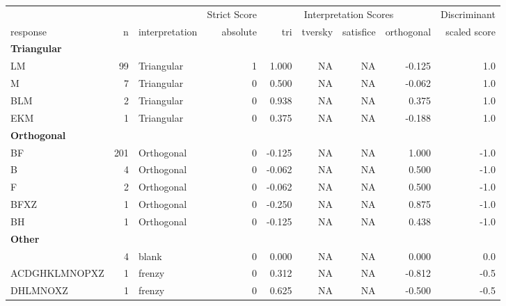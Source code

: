\documentclass[
  letterpaper,
  DIV=11,
  numbers=noendperiod]{scrreprt}
\begin{document}
\begin{tabular}[t]{l|r|l|r|r|r|r|r|r}
\hline
\multicolumn{3}{c|}{ } & \multicolumn{1}{c|}{Strict Score} & \multicolumn{4}{c|}{Interpretation Scores} & \multicolumn{1}{c}{Discriminant} \\
\cline{4-4} \cline{5-8} \cline{9-9}
response & n & interpretation & absolute & tri & tversky & satisfice & orthogonal & scaled score\\
\hline
\multicolumn{9}{l}{\textbf{Triangular}}\\
\hline
\hspace{1em}LM & 99 & Triangular & 1 & 1.000 & NA & NA & -0.125 & 1.0\\
\hline
\hspace{1em}M & 7 & Triangular & 0 & 0.500 & NA & NA & -0.062 & 1.0\\
\hline
\hspace{1em}BLM & 2 & Triangular & 0 & 0.938 & NA & NA & 0.375 & 1.0\\
\hline
\hspace{1em}EKM & 1 & Triangular & 0 & 0.375 & NA & NA & -0.188 & 1.0\\
\hline
\multicolumn{9}{l}{\textbf{Orthogonal}}\\
\hline
\hspace{1em}BF & 201 & Orthogonal & 0 & -0.125 & NA & NA & 1.000 & -1.0\\
\hline
\hspace{1em}B & 4 & Orthogonal & 0 & -0.062 & NA & NA & 0.500 & -1.0\\
\hline
\hspace{1em}F & 2 & Orthogonal & 0 & -0.062 & NA & NA & 0.500 & -1.0\\
\hline
\hspace{1em}BFXZ & 1 & Orthogonal & 0 & -0.250 & NA & NA & 0.875 & -1.0\\
\hline
\hspace{1em}BH & 1 & Orthogonal & 0 & -0.125 & NA & NA & 0.438 & -1.0\\
\hline
\multicolumn{9}{l}{\textbf{Other}}\\
\hline
\hspace{1em} & 4 & blank & 0 & 0.000 & NA & NA & 0.000 & 0.0\\
\hline
\hspace{1em}ACDGHKLMNOPXZ & 1 & frenzy & 0 & 0.312 & NA & NA & -0.812 & -0.5\\
\hline
\hspace{1em}DHLMNOXZ & 1 & frenzy & 0 & 0.625 & NA & NA & -0.500 & -0.5\\

\end{tabular}
\end{document}
